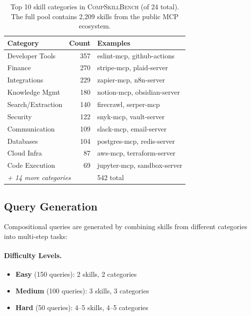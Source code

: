 \documentclass[11pt]{article}
\newcommand{\benchmark}{\textsc{CompSkillBench}}
\begin{document}
\begin{table}[t]
\centering
\small
\setlength{\tabcolsep}{4pt}
\begin{tabular}{lrl}
\toprule
\textbf{Category} & \textbf{Count} & \textbf{Examples} \\
\midrule
Developer Tools & 357 & eslint-mcp, github-actions \\
Finance & 270 & stripe-mcp, plaid-server \\
Integrations & 229 & zapier-mcp, n8n-server \\
Knowledge Mgmt & 180 & notion-mcp, obsidian-server \\
Search/Extraction & 140 & firecrawl, serper-mcp \\
Security & 122 & snyk-mcp, vault-server \\
Communication & 109 & slack-mcp, email-server \\
Databases & 104 & postgres-mcp, redis-server \\
Cloud Infra & 87 & aws-mcp, terraform-server \\
Code Execution & 69 & jupyter-mcp, sandbox-server \\
\midrule
\multicolumn{2}{l}{\textit{+ 14 more categories}} & 542 total \\
\bottomrule
\end{tabular}
\caption{Top 10 skill categories in \benchmark{} (of 24 total). The full pool contains 2{,}209 skills from the public MCP ecosystem.}
\label{tab:categories}
\end{table}

\subsection{Query Generation}

Compositional queries are generated by combining skills from different categories into multi-step tasks:

\paragraph{Difficulty Levels.}
\begin{itemize}[nosep,leftmargin=*]
  \item \textbf{Easy} (150 queries): 2 skills, 2 categories
  \item \textbf{Medium} (100 queries): 3 skills, 3 categories
  \item \textbf{Hard} (50 queries): 4--5 skills, 4--5 categories
\end{itemize}
\end{document}
